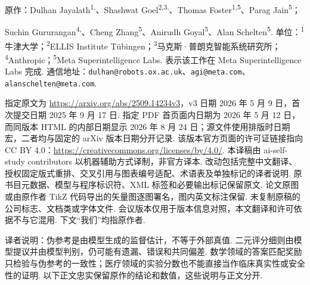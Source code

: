 \label{cat-paper}
原作：Dulhan Jayalath\textsuperscript{1,\dag}、Shashwat Goel\textsuperscript{2,3,\dag}、Thomas Foster\textsuperscript{1,5}、Parag Jain\textsuperscript{5}；\par
\noindent Suchin Gururangan\textsuperscript{4,\dag}、Cheng Zhang\textsuperscript{5}、Anirudh Goyal\textsuperscript{5}、Alan Schelten\textsuperscript{5}.
单位：\textsuperscript{1}牛津大学；\textsuperscript{2}ELLIS Institute Tübingen；\textsuperscript{3}马克斯·普朗克智能系统研究所；\textsuperscript{4}Anthropic；\textsuperscript{5}Meta Superintelligence Labs. \textsuperscript{\dag}表示该工作在 Meta Superintelligence Labs 完成.
通信地址：\texttt{dulhan@robots.ox.ac.uk}、\texttt{agi@meta.com}、\texttt{alanschelten@meta.com}.

指定原文为 \url{https://arxiv.org/abs/2509.14234v3}，v3 日期 2026 年 5 月 9 日，首次提交日期 2025 年 9 月 17 日. 指定 PDF 首页面内日期为 2026 年 5 月 12 日，而同版本 HTML 的内部日期显示 2026 年 8 月 24 日；源文件使用排版时日期宏，二者均与固定的 arXiv 版本日期分开记录. 该版本官方页面的许可证链接指向 CC BY 4.0：\url{https://creativecommons.org/licenses/by/4.0/}. 本译稿由 ai-self-study contributors 以机器辅助方式译制，非官方译本. 改动包括完整中文翻译、授权固定版式重排、交叉引用与图表编号适配、术语表及单独标记的译者说明. 原书目元数据、模型与程序标识符、XML 标签和必要输出标记保留原文. 论文原图或由原作者 TikZ 代码导出的矢量图逐图署名，图内英文标注保留. 未复制原稿的公司标志、文档类或字体文件. 会议版本仅用于版本信息对照，本文翻译和许可依据不与它混用. 下文“我们”均指原作者.

\begin{remark}
译者说明：伪参考是由模型生成的监督估计，不等于外部真值. 二元评分细则由模型提议并由模型判别，仍可能有遗漏、错误和共同偏差. 数学领域的答案匹配奖励只检验与伪参考的一致性；医疗领域的实验分数也不能直接当作临床真实性或安全性的证明. 以下正文忠实保留原作的结论和数值，这些说明与正文分开.
\end{remark}




